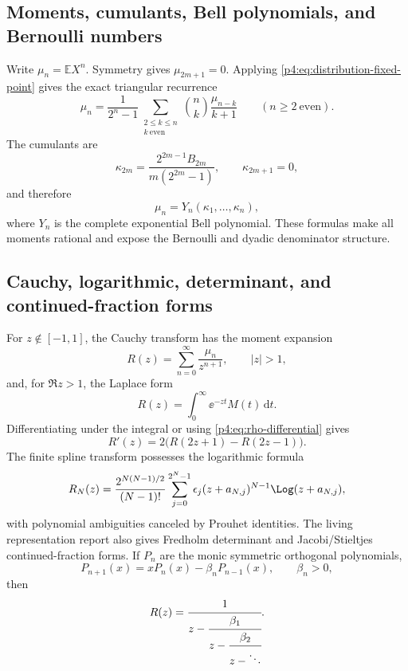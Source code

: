 \documentclass[11pt,oneside]{article}
\theoremstyle{definition}
\newcommand{\dd}{\,\mathrm d}
\newcommand{\E}{\mathbb E}
\begin{document}
\subsection{Moments, cumulants, Bell polynomials, and Bernoulli numbers}

Write \(\mu_n=\E X^n\). Symmetry gives \(\mu_{2m+1}=0\). Applying
\eqref{p4:eq:distribution-fixed-point} gives the exact triangular recurrence
\begin{equation}
 \mu_n=\frac{1}{2^n-1}
 \sum_{\substack{2\le k\le n\\k\ \mathrm{even}}}
 \binom{n}{k}\frac{\mu_{n-k}}{k+1}
 \qquad(n\ge2\ \mathrm{even}).
 \label{p4:eq:moment-recurrence}
\end{equation}
The cumulants are
\begin{equation}
 \kappa_{2m}=\frac{2^{2m-1}B_{2m}}{m(2^{2m}-1)},
 \qquad \kappa_{2m+1}=0,
 \label{p4:eq:cumulants}
\end{equation}
and therefore
\begin{equation}
 \mu_n=Y_n(\kappa_1,\ldots,\kappa_n),
 \label{p4:eq:Bell-moments}
\end{equation}
where \(Y_n\) is the complete exponential Bell polynomial. These formulas make all moments
rational and expose the Bernoulli and dyadic denominator structure.

\subsection{Cauchy, logarithmic, determinant, and continued-fraction forms}

For \(z\notin[-1,1]\), the Cauchy transform has the moment expansion
\begin{equation}
 R(z)=\sum_{n=0}^{\infty}\frac{\mu_n}{z^{n+1}},\qquad |z|>1,
 \label{p4:eq:R-moment-series}
\end{equation}
and, for \(\Re z>1\), the Laplace form
\begin{equation}
 R(z)=\int_0^{\infty}\ee^{-zt}M(t)\dd t.
 \label{p4:eq:R-Laplace}
\end{equation}
Differentiating under the integral or using \eqref{p4:eq:rho-differential} gives
\begin{equation}
 R'(z)=2\bigl(R(2z+1)-R(2z-1)\bigr).
 \label{p4:eq:R-differential}
\end{equation}
The finite spline transform possesses the logarithmic formula
\begin{equation}
 R_N(z)=\frac{2^{N(N-1)/2}}{(N-1)!}
 \sum_{j=0}^{2^N-1}\epsilon_j
 (z+a_{N,j})^{N-1}\Log(z+a_{N,j}),
 \label{p4:eq:finite-log-resolvent}
\end{equation}
with polynomial ambiguities canceled by Prouhet identities. The living representation
report also gives Fredholm determinant and Jacobi/Stieltjes continued-fraction forms. If
\(P_n\) are the monic symmetric orthogonal polynomials,
\begin{equation}
 P_{n+1}(x)=xP_n(x)-\beta_nP_{n-1}(x),\qquad \beta_n>0,
 \label{p4:eq:Jacobi-recurrence}
\end{equation}
then
\begin{equation}
 R(z)=\cfrac{1}{z-\cfrac{\beta_1}{z-\cfrac{\beta_2}{z-\ddots}}}.
 \label{p4:eq:Jacobi-CF}
\end{equation}
\end{document}
